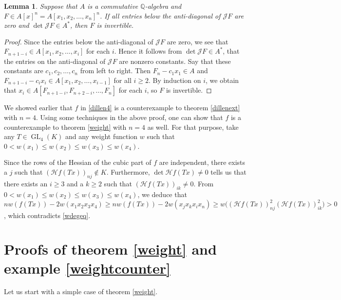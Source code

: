 \documentclass[10pt]{article}
\newtheorem{lemma}[theorem]{Lemma}
\theoremstyle{remark}
\theoremstyle{definition}
\newcommand{\jac}{{\mathcal J}}
\newcommand{\hess}{{\mathcal H}}
\newcommand{\GL}{\operatorname{GL}}
\newcommand{\Q}{{\mathbb Q}}
\begin{document}
\begin{lemma} \label{antitri}
Suppose that $A$ is a commutative $\Q$-algebra and $F \in A[x]^n = A[x_1,x_2,\ldots,x_n]^n$. If all entries
below the anti-diagonal of $\jac F$ are zero and $\det \jac F \in A^{*}$, then $F$ is invertible.
\end{lemma}

\begin{proof}
Since the entries below the anti-diagonal
of $\jac F$ are zero, we see that $F_{n+1-i} \in A[x_1, x_2, \ldots, x_i]$
for each $i$. Hence it follows from $\det \jac F \in A^{*}$, that the entries
on the anti-diagonal of $\jac F$ are nonzero constants. Say that these constants are
$c_1, c_2, \ldots, \allowbreak c_n$ from left to right. Then $F_n - c_1 x_1 \in A$ and 
$F_{n+1-i} - c_i x_i \in A[x_1, x_2, \ldots, x_{i-1}]$ for all $i \ge 2$. By induction on $i$, 
we obtain that $x_i \in A[F_{n+1-i},F_{n+2-i},\ldots,F_n]$ for each $i$, 
so $F$ is invertible. \qedhere
\end{proof}

\noindent
We showed earlier that $f$ in \eqref{dillen4} is a counterexample to theorem \ref{dillenext} with 
$n = 4$. Using some techniques in the above proof, one can show that $f$ is a counterexample
to theorem \ref{weight} with $n = 4$ as well. For that purpose, take any $T \in \GL_4(K)$
and any weight function $w$ such that $0 < w(x_1) \le w(x_2) \le w(x_3) \le w(x_4)$.  

Since the rows of the Hessian of the cubic part of $f$ are independent, there exists
a $j$ such that $(\hess f(Tx))_{nj} \notin K$. Furthermore, $\det \hess f(Tx) \ne 0$
tells us that there exists an $i \ge 3$ and a $k \ge 2$ such that $(\hess f(Tx))_{ik} \ne 0$.
From $0 < w(x_1) \le w(x_2) \le w(x_3) \le w(x_4)$, we deduce that 
$n w(f(Tx)) - 2 w(x_1x_2x_3x_4) \ge n w(f(Tx)) - 2 w(x_jx_kx_ix_n) \ge 
w\big((\hess f(Tx))^2_{nj}(\hess f(Tx))^2_{ik}\big) > 0$, which contradicts \eqref{wdegeq}.


\section{Proofs of theorem \ref{weight} and example \ref{weightcounter}} \label{second}

Let us start with a simple case of theorem \ref{weight}.
\end{document}
